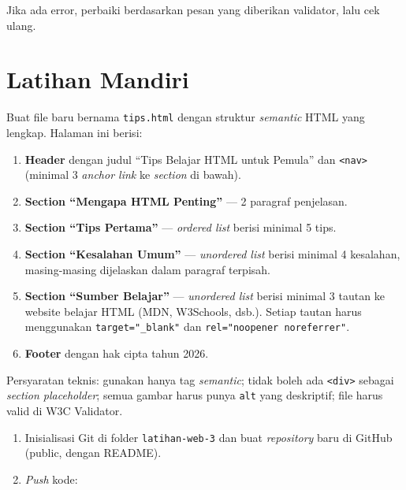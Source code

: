 Jika ada error, perbaiki berdasarkan pesan yang diberikan validator, lalu cek ulang.

\section{Latihan Mandiri}
\label{sec:m03-latihan}

\begin{latihan}
Buat file baru bernama \texttt{tips.html} dengan struktur \emph{semantic} HTML yang lengkap. Halaman ini berisi:
\begin{enumerate}
  \item \textbf{Header} dengan judul ``Tips Belajar HTML untuk Pemula'' dan \texttt{<nav>} (minimal 3 \emph{anchor link} ke \emph{section} di bawah).
  \item \textbf{Section ``Mengapa HTML Penting''} --- 2 paragraf penjelasan.
  \item \textbf{Section ``Tips Pertama''} --- \emph{ordered list} berisi minimal 5 tips.
  \item \textbf{Section ``Kesalahan Umum''} --- \emph{unordered list} berisi minimal 4 kesalahan, masing-masing dijelaskan dalam paragraf terpisah.
  \item \textbf{Section ``Sumber Belajar''} --- \emph{unordered list} berisi minimal 3 tautan ke website belajar HTML (MDN, W3Schools, dsb.). Setiap tautan harus menggunakan \texttt{target="\_blank"} dan \texttt{rel="noopener noreferrer"}.
  \item \textbf{Footer} dengan hak cipta tahun 2026.
\end{enumerate}
Persyaratan teknis: gunakan hanya tag \emph{semantic}; tidak boleh ada \texttt{<div>} sebagai \emph{section placeholder}; semua gambar harus punya \texttt{alt} yang deskriptif; file harus valid di W3C Validator.
\end{latihan}

\begin{latihan}
\begin{enumerate}
  \item Inisialisasi Git di folder \texttt{latihan-web-3} dan buat \emph{repository} baru di GitHub (public, dengan README).
  \item \emph{Push} kode:
\end{enumerate}
\end{latihan}

